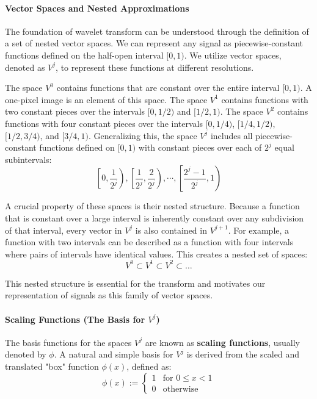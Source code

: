 
\paragraph{Vector Spaces and Nested Approximations}

The foundation of wavelet transform can be understood through the definition of a set of nested vector spaces. We can represent any signal as piecewise-constant functions defined on the half-open interval $[0, 1)$. We utilize vector spaces, denoted as $V^j$, to represent these functions at different resolutions.

The space $V^0$ contains functions that are constant over the entire interval $[0, 1)$. A one-pixel image is an element of this space. The space $V^1$ contains functions with two constant pieces over the intervals $[0, 1/2)$ and $[1/2, 1)$. The space $V^2$ contains functions with four constant pieces over the intervals $[0, 1/4)$, $[1/4, 1/2)$, $[1/2, 3/4)$, and $[3/4, 1)$. Generalizing this, the space $V^j$ includes all piecewise-constant functions defined on $[0, 1)$ with constant pieces over each of $2^j$ equal subintervals:
$$ \left[0, \frac{1}{2^j}\right), \left[\frac{1}{2^j}, \frac{2}{2^j}\right), \cdots, \left[\frac{2^j-1}{2^j}, 1\right) $$

A crucial property of these spaces is their nested structure. Because a function that is constant over a large interval is inherently constant over any subdivision of that interval, every vector in $V^j$ is also contained in $V^{j+1}$. For example, a function with two intervals can be described as a function with four intervals where pairs of intervals have identical values. This creates a nested set of spaces:
$$V^0 \subset V^1 \subset V^2 \subset \dots$$

This nested structure is essential for the transform and motivates our representation of signals as this family of vector spaces.

\paragraph{Scaling Functions (The Basis for $V^j$)}

The basis functions for the spaces $V^j$ are known as \textbf{scaling functions}, usually denoted by $\phi$. A natural and simple basis for $V^j$ is derived from the scaled and translated "box" function $\phi(x)$, defined as:
$$\phi(x) := \begin{cases} 1 & \text{for } 0 \le x < 1 \\ 0 & \text{otherwise} \end{cases}$$

